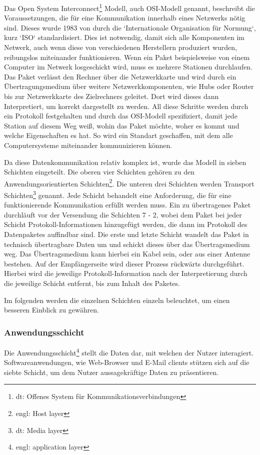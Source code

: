 \documentclass[12pt]{article}
\begin{document}
	Das Open System Interconnect\footnote{dt: Offenes System für Kommunikationsverbindungen} Modell, auch OSI-Modell genannt, beschreibt die Voraussetzungen, die für eine Kommunikation innerhalb eines Netzwerks nötig sind. Dieses wurde 1983 von durch die `Internationale Organisation für Normung`, kurz `ISO` standardisiert. Dies ist notwendig, damit sich alle Komponenten im Netwerk, auch wenn diese von verschiedenen Herstellern produziert wurden, reibungslos miteinander funktionieren. Wenn ein Paket beispielsweise von einem Computer im Netwerk losgeschickt wird, muss es mehrere Stationen durchlaufen. Das Paket verlässt den Rechner über die Netzwerkkarte und wird durch ein Übertragungsmedium über weitere Netzwerkkomponenten, wie Hubs oder Router bis zur Netzwerkkarte des Zielrechners geleitet. Dort wird dieses dann Interpretiert, um korrekt dargestellt zu werden. All diese Schritte werden durch ein Protokoll festgehalten und durch das OSI-Modell spezifiziert, damit jede Station auf diesem Weg weiß, wohin das Paket möchte, woher es kommt und welche Eigenschaften es hat. So wird ein Standart geschaffen, mit dem alle Computersysteme miteinander kommunizieren können.
	
	Da diese  Datenkommunikation relativ komplex ist, wurde das Modell in sieben Schichten eingeteilt. Die oberen vier Schichten gehören zu den Anwendungsorientierten Schichten\footnote{engl: Host layer}. Die unteren drei Schichten werden Transport Schichten\footnote{dt: Media layer} genannt. Jede Schicht behandelt eine Anforderung, die für eine funktionierende Kommunikation erfüllt werden muss. Ein zu übertragenes Paket durchläuft vor der Versendung die Schichten 7 - 2, wobei dem Paket bei jeder Schicht Protokoll-Informationen hinzugefügt werden, die dann im Protokoll des Datenpaketes auffindbar sind. Die erste und letzte Schicht wandelt das Paket in technisch übertragbare Daten um und schickt dieses über das Übertragsmedium weg. Das Übertragsmedium kann hierbei ein Kabel sein, oder aus einer Antenne bestehen. Auf der Empfängerseite wird dieser Prozess rückwärts durchgeführt. Hierbei wird die jeweilige Protokoll-Information nach der Interpretierung durch die jeweilige Schicht entfernt, bis zum Inhalt des Paketes.
	
	Im folgenden werden die einzelnen Schichten  einzeln beleuchtet, um einen besseren Einblick zu gewähren.

\subsubsection{Anwendungsschicht}
	Die Anwendungsschicht\footnote{engl: application layer} stellt die Daten dar, mit welchen der Nutzer interagiert. Softwareanwendungen, wie Web-Browser und E-Mail clients stützen sich auf die siebte Schicht, um dem Nutzer aussagekräftige Daten zu präsentieren. 
	
\end{document}
